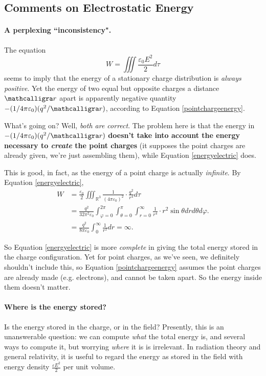 \subsection{Comments on Electrostatic Energy}

\paragraph{A perplexing ``inconsistency".} The equation 
\[W=\iiint\frac{\varepsilon_0 E^2}{2}d\tau\]
seems to imply that the energy of a stationary charge distribution is \textit{always positive}. Yet the energy of two equal but opposite charges a distance $\scr$ apart is apparently negative quantity $-(1/4\pi\varepsilon_0)(q^2/\scr)$, according to Equation \ref{pointchargeenergy}.

What's going on? Well, \textit{both are correct}. The problem here is that the energy in $-(1/4\pi\varepsilon_0)(q^2/\scr)$ \textbf{doesn't take into account the energy necessary to \textit{create} the point charges} (it supposes the point charges are already given, we're just assembling them), while Equation \ref{energyelectric} does. 

This is good, in fact, as the energy of a point charge is actually \textit{infinite}. By Equation \ref{energyelectric},
\begin{align*}
W&=\frac{\varepsilon_0}{2}\iiint_{\mathbb{R}^3}\frac{1}{(4\pi\varepsilon_0)^2}\cdot \frac{q^2}{r^4}d\tau\\
&=\frac{q^2}{32\pi^2\varepsilon_0}\int_{\varphi=0}^{2\pi}\int_{\theta=0}^\pi\int_{r=0}^\infty \frac{1}{r^4}\cdot r^2\sin\theta drd\theta d\varphi.\\
&=\frac{q^2}{8\pi\varepsilon_0}\int_0^\infty \frac{1}{r^2}dr=\infty.
\end{align*}

So Equation \ref{energyelectric} is more \textit{complete} in giving the total energy stored in the charge configuration. Yet for point charges, as we've seen, we definitely shouldn't include this, so Equation \ref{pointchargeenergy} assumes the point charges are already made (e.g. electrons), and cannot be taken apart. So the energy inside them doesn't matter.

\paragraph{Where is the energy stored?} Is the energy stored in the charge, or in the field? Presently, this is an unanswerable question: we can compute \textit{what} the total energy is, and several ways to compute it, but worrying \textit{where} it is is irrelevant. In radiation theory and general relativity, it is useful to regard the energy as stored in the field with energy density $\frac{\varepsilon E^2}{2}$ per unit volume.

